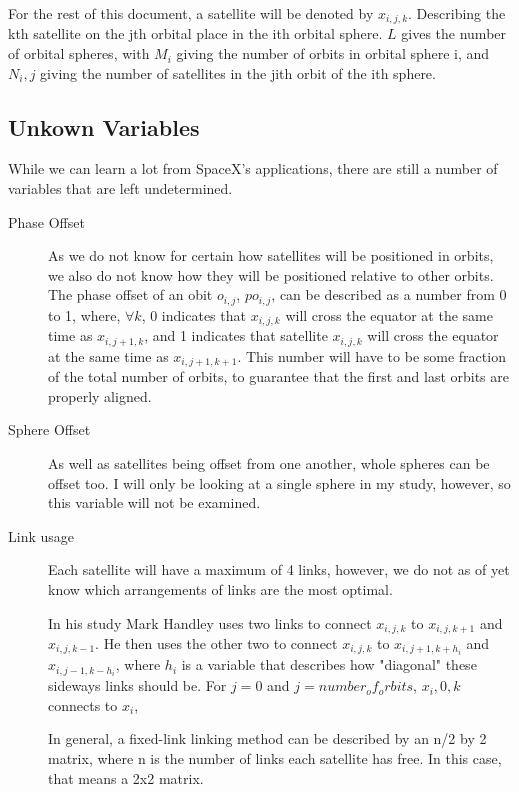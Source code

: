 \documentclass[12pt]{article}
\begin{document}
For the rest of this document, a satellite will be denoted by $x_{i,j,k}$. Describing the kth satellite on the jth orbital place in the ith orbital sphere. $L$ gives the number of orbital spheres, with $M_i$ giving the number of orbits in orbital sphere i, and $N_i,j$ giving the number of satellites in the jith orbit of the ith sphere.

\subsection{Unkown Variables}
While we can learn a lot from SpaceX's applications, there are still a number of variables that are left undetermined. 

\begin{description}	
\item[Phase Offset]
As we do not know for certain how satellites will be positioned in orbits, we also do not know how they will be positioned relative to other orbits. The phase offset of an obit $o_{i,j}$, $po_{i,j}$, can be described as a number from 0 to 1, where, $\forall k$, 0 indicates that  $x_{i,j,k}$ will cross the equator at the same time as $x_{i,j+1,k}$, and 1 indicates that satellite $x_{i,j,k}$ will cross the equator at the same time as $x_{i,j+1,k+1}$. This number will have to be some fraction of the total number of orbits, to guarantee that the first and last orbits are properly aligned.

\item[Sphere Offset]
As well as satellites being offset from one another, whole spheres can be offset too. I will only be looking at a single sphere in my study, however, so this variable will not be examined.

\item[Link usage]
Each satellite will have a maximum of 4 links, however, we do not as of yet know which arrangements of links are the most optimal.

In his study Mark Handley uses two links to connect $x_{i,j,k}$ to $x_{i,j,k+1}$ and $x_{i,j,k-1}$. He then uses the other two to connect $x_{i,j,k}$ to $x_{i,j+1,k+h_i}$ and $x_{i,j-1,k-h_i}$, where $h_i$ is a variable that describes how "diagonal" these sideways links should be. For $j = 0$ and $j = number_of_orbits$, $x_i,0,k$ connects to $x_i$, %

In general, a fixed-link linking method can be described by an n/2 by 2 matrix, where n is the number of links each satellite has free. In this case, that means a 2x2 matrix.
\end{description}
\end{document}
